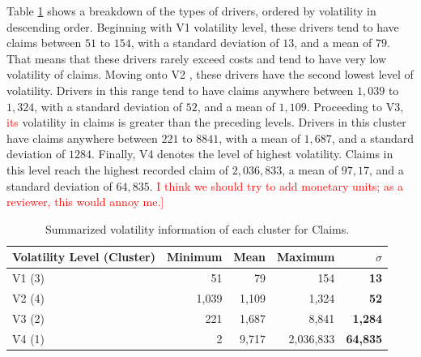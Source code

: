 \documentclass[11pt,letterpaper]{article}
\numberwithin{equation}{section}
\numberwithin{equation}{section}
\numberwithin{equation}{section}
\begin{document}
Table \ref{table:volSev} shows a breakdown of the types of drivers, ordered by volatility in descending order. Beginning with V1 volatility level, these drivers tend to have claims between $51$ to $154$, with a standard deviation of $13$, and a mean of $79$. That means that these drivers rarely exceed costs and tend to have very low volatility of claims. Moving onto V2 , these drivers have the second lowest level of volatility. Drivers in this range tend to have claims anywhere between $1,039$ to $1,324$, with a standard deviation of $52$, and a mean of $1,109$.  Proceeding to V3, \textcolor{red}{its} volatility in claims is greater than the preceding levels. Drivers in this cluster have claims anywhere between $221$ to $8841$, with a mean of $1,687$, and a standard deviation of $1284$. Finally, V4 denotes the level of highest volatility. Claims in this level  reach the highest recorded claim of $2,036,833$, a mean of $97,17$, and a standard deviation of $64,835$. \textcolor{red}{I think we should try to add monetary units; as a reviewer, this would annoy me.]}
\begin{table}[!htb]
\centering
\caption{Summarized volatility information of each cluster for Claims.}
\label{table:volSev}
\begin{tabular}{lrrrr}
\hline
Volatility Level (Cluster)     & Minimum & Mean  & Maximum & $\sigma$    \\
\hline
V1 (3) & 51  & 79 & 154 & \textbf{ 13} \\
V2 (4) & 1,039  & 1,109  &  1,324 & \textbf{ 52} \\
V3 (2) & 221 & 1,687  & 8,841  &\textbf{ 1,284}  \\
V4 (1) & 2 & 9,717 & 2,036,833  & \textbf{ 64,835}\\
\hline
\end{tabular}
\end{table}
\end{document}
